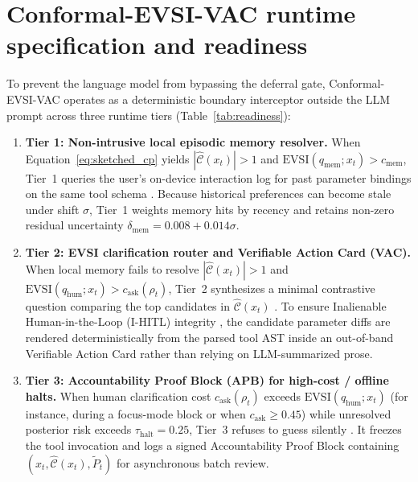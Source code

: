 \documentclass[11pt]{article}
\begin{document}
\section{Conformal-EVSI-VAC runtime specification and readiness}\label{sec:architecture}

To prevent the language model from bypassing the deferral gate, Conformal-EVSI-VAC operates as a deterministic boundary interceptor \citep{zhao2026clawguard, zhang2026actgov} outside the LLM prompt across three runtime tiers (Table~\ref{tab:readiness}):

\begin{enumerate}
  \item \textbf{Tier 1: Non-intrusive local episodic memory resolver.} When Equation~\eqref{eq:sketched_cp} yields $|\hat{\mathcal{C}}(x_t)| > 1$ and $\mathrm{EVSI}(q_{\mathrm{mem}};\allowbreak x_t) > c_{\mathrm{mem}}$, Tier~1 queries the user's on-device interaction log for past parameter bindings on the same tool schema \citep{yao2024taubench}. Because historical preferences can become stale under shift $\sigma$, Tier~1 weights memory hits by recency and retains non-zero residual uncertainty $\delta_{\mathrm{mem}} = 0.008 + 0.014\sigma$.
  \item \textbf{Tier 2: EVSI clarification router and Verifiable Action Card (VAC).} When local memory fails to resolve $|\hat{\mathcal{C}}(x_t)| > 1$ and $\mathrm{EVSI}(q_{\mathrm{hum}};\allowbreak x_t) > c_{\mathrm{ask}}(\rho_t)$, Tier~2 synthesizes a minimal contrastive question comparing the top candidates in $\hat{\mathcal{C}}(x_t)$ \citep{kuhn2023clam, zhang2024clarify}. To ensure Inalienable Human-in-the-Loop (I-HITL) integrity \citep{breckenridge2026ihitl}, the candidate parameter diffs are rendered deterministically from the parsed tool AST inside an out-of-band Verifiable Action Card rather than relying on LLM-summarized prose.
  \item \textbf{Tier 3: Accountability Proof Block (APB) for high-cost / offline halts.} When human clarification cost $c_{\mathrm{ask}}(\rho_t)$ exceeds $\mathrm{EVSI}(q_{\mathrm{hum}};\allowbreak x_t)$ (for instance, during a focus-mode block or when $c_{\mathrm{ask}} \ge 0.45$) while unresolved posterior risk exceeds $\tau_{\mathrm{halt}} = 0.25$, Tier~3 refuses to guess silently \citep{turner2020aup, elina2026maat}. It freezes the tool invocation and logs a signed Accountability Proof Block containing $(x_t,\allowbreak \hat{\mathcal{C}}(x_t),\allowbreak \tilde{P}_t)$ for asynchronous batch review.
\end{enumerate}
\end{document}

